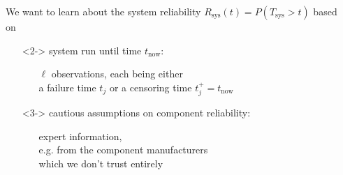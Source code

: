 \documentclass{beamer}
\def\play{{\structure{$\blacktriangleright$}}}
\newcommand{\Rsys}{R_\text{sys}}
\def\Tsys{T_\text{sys}}
\def\tnow{t_\text{now}}
\begin{document}
{\begin{columns}
\begin{column}{0.25\textwidth}
\begin{tikzpicture}
\end{tikzpicture}%
\end{column}
\begin{column}{0.75\textwidth}
We want to learn about the system reliability $\Rsys(t) = P(\Tsys > t)$ based on
\begin{enumerate}
\item[\play]<2-> system run until time $\tnow$:
 \begin{itemize}
 \item[] $\ell$ observations, each being either\\ a failure time $t_j$ or a censoring time $t_j^+ = \tnow$
 \end{itemize}
\item[\play]<3-> cautious assumptions on component reliability:
 \begin{itemize}
 \item[] expert information,\\ e.g. from the component manufacturers\\ \alert{which we don't trust entirely}
 \end{itemize}
\end{enumerate}
\end{column}
\end{columns}
}
\end{document}
